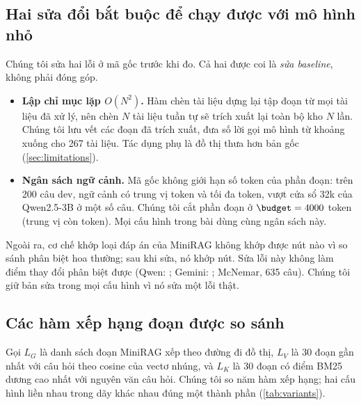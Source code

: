 \subsection{Hai sửa đổi bắt buộc để chạy được với mô hình nhỏ}\label{sec:fixes}
Chúng tôi sửa hai lỗi ở mã gốc trước khi đo. Cả hai được coi là \emph{sửa baseline}, không phải đóng góp.
\begin{itemize}
  \item \textbf{Lập chỉ mục lặp $O(N^2)$.} Hàm chèn tài liệu dựng lại tập đoạn từ mọi tài liệu đã xử lý, nên chèn $N$ tài liệu tuần tự sẽ trích xuất lại toàn bộ kho $N$ lần.
  Chúng tôi lưu vết các đoạn đã trích xuất, đưa số lời gọi mô hình từ khoảng \callsBefore{} xuống \callsAfter{} cho 267 tài liệu.
  Tác dụng phụ là đồ thị thưa hơn bản gốc (\cref{sec:limitations}).
  \item \textbf{Ngân sách ngữ cảnh.} Mã gốc không giới hạn số token của phần đoạn: trên 200 câu dev, ngữ cảnh có trung vị \ctxNoCapMed{} token và tối đa \ctxNoCapMax{} token, vượt cửa sổ 32k của Qwen2.5-3B ở một số câu.
  Chúng tôi cắt phần đoạn ở $\budget = 4000$ token (trung vị còn \ctxCapMed{} token). Mọi cấu hình trong bài dùng cùng ngân sách này.
\end{itemize}
Ngoài ra, cơ chế khớp loại đáp án của MiniRAG không khớp được nút nào vì so sánh phân biệt hoa thường; sau khi sửa, nó khớp \atypeNodesFixed{} nút.
Sửa lỗi này không làm điểm thay đổi phân biệt được (Qwen: \atypeQwen{}; Gemini: \atypeGemini{}; McNemar, 635 câu).
Chúng tôi giữ bản sửa trong mọi cấu hình vì nó sửa một lỗi thật.

\subsection{Các hàm xếp hạng đoạn được so sánh}\label{sec:variants}
Gọi $L_G$ là danh sách đoạn MiniRAG xếp theo đường đi đồ thị, $L_V$ là 30 đoạn gần nhất với câu hỏi theo cosine của vectơ nhúng, và $L_K$ là 30 đoạn có điểm BM25 dương cao nhất với nguyên văn câu hỏi.
Chúng tôi so năm hàm xếp hạng; hai cấu hình liền nhau trong dãy khác nhau đúng một thành phần (\cref{tab:variants}).

